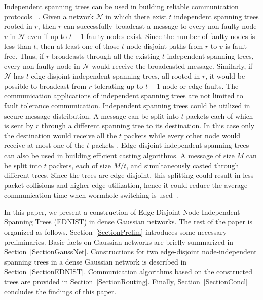 \documentclass[12pt,journal,compsoc,onecolumn,]{IEEEtran}
\begin{document}
Independent spanning trees can be used in building reliable communication
protocols~\cite{Bao19983}\cite{Chang2015489}\cite{6747363}\cite{DBLP:journals/tc/FragopoulouA96}
\cite{ITAI198843}\cite{Kong:2006:BRM:2692151.2692155}\cite{Touzene:2002:EST:636533.636538}
\cite{DBLP:journals/jpdc/TouzeneDM05}\cite{Tseng96efficientbroadcasting}\cite{DBLP:journals/jpdc/WangB01}
\cite{Yang01012014}\cite{6948321}\cite{10.1007/s11227-014-1346-z}.
Given a network $\mathcal{N}$ in which there exist $t$ independent spanning
trees rooted in $r$, then $r$ can successfully broadcast a message to every
non faulty node $v$ in $\mathcal{N}$ even if up to $t-1$ faulty nodes exist.
Since the number of faulty nodes is less than $t$, then at least one of those
$t$ node disjoint paths from $r$ to $v$ is fault free. Thus, if $r$ broadcasts
through all the existing $t$ independent spanning trees, every non faulty node
in $\mathcal{N}$ would receive the broadcasted message. Similarly, if
$\mathcal{N}$ has $t$ edge disjoint independent spanning trees, all rooted in
$r$, it would be possible to broadcast from $r$ tolerating up to $t-1$ node or
edge faults. The communication applications of independent spanning trees are
not limited to fault tolerance communication. Independent spanning trees could
be utilized in secure message distribution. A message can be split into $t$
packets each of which is sent by $r$ through a different spanning tree to its
destination. In this case only the destination would receive all the $t$
packets while every other node would receive at most one of the $t$ packets
\cite{Lin2010414}\cite{Yang20111254}\cite{Yang:2009:IST:1726593.1728973}. Edge disjoint
independent spanning trees can also be used in building efficient casting
algorithms. A message of size $M$ can be split into $t$ packets, each of size
$M/t$, and simultaneously casted through different trees. Since the trees are
edge disjoint, this splitting could result in less packet collisions and
higher edge utilization, hence it could reduce the average communication time when
wormhole switching is used~\cite{Alsaleh}\cite{dally2004principles}.


In this paper, we present a construction of Edge-Disjoint Node-Independent Spanning Trees
(EDNIST) in dense Gaussian networks.
The rest of the paper is organized as follows. Section~\ref{SectionPrelim}
introduces some necessary preliminaries. Basic facts on Gaussian networks
are briefly summarized in Section~\ref{SectionGaussNet}.
Constructions for two edge-disjoint node-independent spanning trees in
a dense Gaussian network is described in Section~\ref{SectionEDNIST}.
Communication algorithms based on the constructed trees are provided in
Section~\ref{SectionRouting}. Finally, Section~\ref{SectionConcl} concludes
the findings of this paper.
\end{document}
